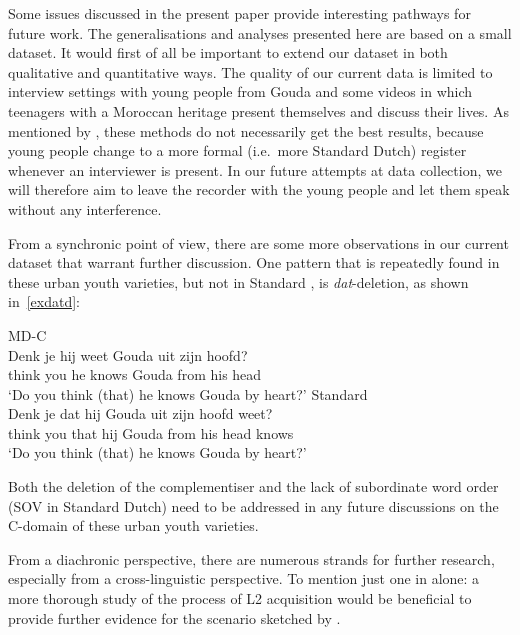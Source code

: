 \documentclass[output=paper]{langsci/langscibook}
\begin{document}
\noindent Some issues discussed in the present paper provide interesting
pathways for future work. The generalisations and analyses presented here are
based on a small dataset. It would first of all be important to extend our
dataset in both qualitative and quantitative ways. The quality of our current
data is limited to interview settings with young people from Gouda and some
videos in which  teenagers with a Moroccan heritage present themselves and
discuss their lives. As mentioned by \citet{Freywaldetal:2015}, these methods
do not necessarily get the best results, because young people change to a more
formal (i.e.\ more Standard Dutch) register whenever an interviewer is present.
In our future attempts at data collection, we will therefore aim to leave the
recorder with the young people and let them speak without any interference.

From a synchronic point of view, there are some more observations in our
current dataset that warrant further discussion. One pattern that is repeatedly
found in these urban youth varieties, but not in Standard , is
\emph{dat}-deletion, as shown in~\eqref{exdatd}:

\ea
    \ea\label{exdatd} MD-C\\
    \gll Denk je hij weet Gouda uit zijn hoofd?\\
    think you he knows Gouda from his head\\
    \trans \enquote*{Do you think (that) he knows Gouda by heart?}
    \ex Standard \\
    \gll Denk je dat hij Gouda uit zijn hoofd weet?\\
    think you that hij Gouda from his head knows\\
    \trans \enquote*{Do you think (that) he knows Gouda by heart?}
    \z
\z

\noindent Both the deletion of the complementiser and the lack of subordinate
word order (SOV in Standard Dutch) need to be addressed in any future
discussions on the C-domain of these urban youth varieties.

From a diachronic perspective, there are numerous strands for further research,
especially from a cross-linguistic perspective. To mention just one in 
alone: a more thorough study of the process of L2 acquisition would be
beneficial to provide further evidence for the scenario sketched by
\citet{Walkden:2017}.

\end{document}
